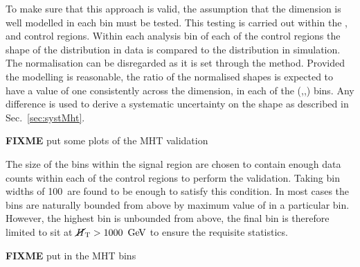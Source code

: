 
To make sure that this approach is valid, the assumption that the \MHT
dimension is well modelled in each bin must be tested. This testing is
carried out within the \gj, \mj and \mmj control regions. Within each
analysis bin of each of the control regions the shape of the \MHT
distribution in data is compared to the distribution in \MC
simulation. The normalisation can be disregarded as it is set through the
\TF method.  Provided the modelling is reasonable, the ratio of the
normalised shapes is expected to have a value of one consistently
across the \MHT dimension, in each of the (\HT,\nj,\nb) bins. Any
difference is used to derive a systematic uncertainty on the \MHT
shape as described in Sec.~\ref{sec:systMht}.

{\bf FIXME} put some plots of the MHT validation

The size of the \MHT bins within the signal region are chosen to
contain enough data counts within each of the control regions to
perform the validation. Taking \MHT bin widths of 100~\gev are found
to be enough to satisfy this condition. In most cases the \MHT bins
are naturally bounded from above by maximum value of \HT in a
particular bin.  However, the highest \HT bin is unbounded from above,
the final \MHT bin is therefore limited to sit at $\mbox{$\cancel{H}_\text{T}$}>1000~\mathrm{\,Ge\kern -0.1em V}$ to
ensure the requisite statistics.

{\bf FIXME} put in the MHT bins



